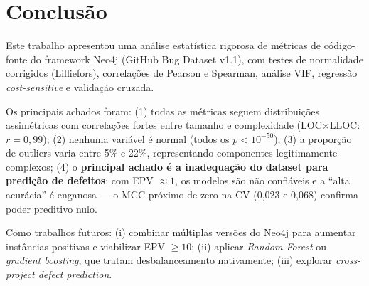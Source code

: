 \documentclass[12pt]{article}
\begin{document}
\section{Conclusão} \label{sec:conclusao}

Este trabalho apresentou uma análise estatística rigorosa de métricas de código-fonte do framework Neo4j (GitHub Bug Dataset v1.1), com testes de normalidade corrigidos (Lilliefors), correlações de Pearson e Spearman, análise VIF, regressão \textit{cost-sensitive} e validação cruzada.

Os principais achados foram: (1) todas as métricas seguem distribuições assimétricas com correlações fortes entre tamanho e complexidade (LOC$\times$LLOC: $r = 0{,}99$); (2) nenhuma variável é normal (todos os $p < 10^{-50}$); (3) a proporção de outliers varia entre 5\% e 22\%, representando componentes legitimamente complexos; (4) o \textbf{principal achado é a inadequação do dataset para predição de defeitos}: com EPV $\approx 1$, os modelos são não confiáveis e a ``alta acurácia'' é enganosa --- o MCC próximo de zero na CV (0,023 e 0,068) confirma poder preditivo nulo.

Como trabalhos futuros: (i) combinar múltiplas versões do Neo4j para aumentar instâncias positivas e viabilizar EPV $\geq 10$; (ii) aplicar \textit{Random Forest} ou \textit{gradient boosting}, que tratam desbalanceamento nativamente; (iii) explorar \textit{cross-project defect prediction}.



\end{document}
